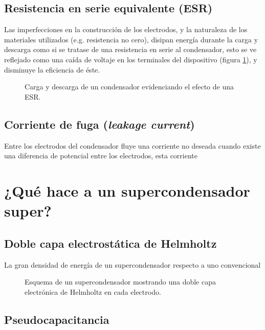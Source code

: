 \subsection{Resistencia en serie equivalente (ESR)}
Las imperfecciones en la construcción de los electrodos, y la naturaleza de los materiales utilizados (e.g. resistencia no cero), disipan energía durante la carga y descarga como si se tratase de una resistencia en serie al condensador, esto se ve reflejado como una caída de voltaje en los terminales del dispositivo (figura \ref{fig:plot:charge-discharge_esr}), y disminuye la eficiencia de éste.

\begin{figure}[h!]
	\caption{Carga y descarga de un condensador evidenciando el efecto de una ESR.}
	\label{fig:plot:charge-discharge_esr}
\end{figure}

\subsection{Corriente de fuga (\emph{leakage current})}
Entre los electrodos del condensador fluye una corriente no deseada cuando existe una diferencia de potencial entre los electrodos, esta corriente 

\section{¿Qué hace a un supercondensador super?}

\subsection{Doble capa electrostática de Helmholtz}
La gran densidad de energía de un supercondensador respecto a uno convencional

\begin{figure}[h!]
	\centering
	\caption{Esquema de un supercondensador mostrando una doble capa electrónica de Helmholtz en cada electrodo.}
	\label{fig:edlc}
\end{figure}
\subsection{Pseudocapacitancia}